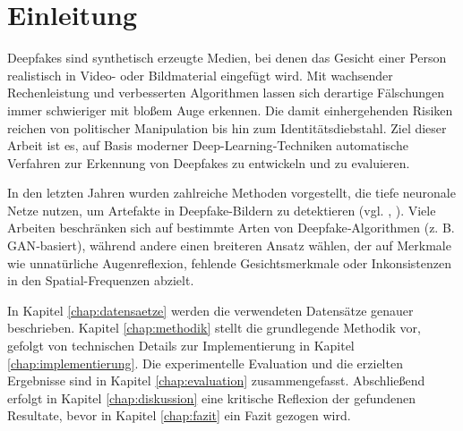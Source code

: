 \chapter{Einleitung}
\label{chap:einleitung}

Deepfakes sind synthetisch erzeugte Medien, bei denen das Gesicht einer Person realistisch in Video- oder Bildmaterial eingefügt wird. Mit wachsender Rechenleistung und verbesserten Algorithmen lassen sich derartige Fälschungen immer schwieriger mit bloßem Auge erkennen. Die damit einhergehenden Risiken reichen von politischer Manipulation bis hin zum Identitätsdiebstahl. Ziel dieser Arbeit ist es, auf Basis moderner Deep-Learning‐Techniken automatische Verfahren zur Erkennung von Deepfakes zu entwickeln und zu evaluieren.

In den letzten Jahren wurden zahlreiche Methoden vorgestellt, die tiefe neuronale Netze nutzen, um Artefakte in Deepfake-Bildern zu detektieren (vgl. \cite{agarwal2020detecting}, \cite{rossler2019faceforensics++}). Viele Arbeiten beschränken sich auf bestimmte Arten von Deepfake‐Algorithmen (z. B. GAN‐basiert), während andere einen breiteren Ansatz wählen, der auf Merkmale wie unnatürliche Augenreflexion, fehlende Gesichtsmerkmale oder Inkonsistenzen in den Spatial-Frequenzen abzielt. 

In Kapitel \ref{chap:datensaetze} werden die verwendeten Datensätze genauer beschrieben. Kapitel \ref{chap:methodik} stellt die grundlegende Methodik vor, gefolgt von technischen Details zur Implementierung in Kapitel \ref{chap:implementierung}. Die experimentelle Evaluation und die erzielten Ergebnisse sind in Kapitel \ref{chap:evaluation} zusammengefasst. Abschließend erfolgt in Kapitel \ref{chap:diskussion} eine kritische Reflexion der gefundenen Resultate, bevor in Kapitel \ref{chap:fazit} ein Fazit gezogen wird.
